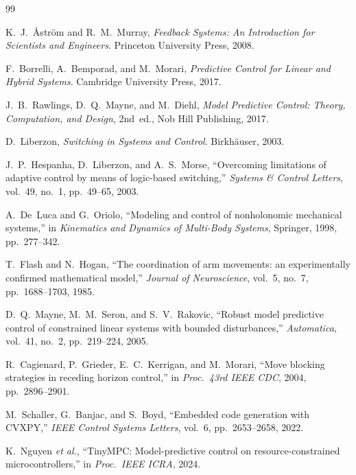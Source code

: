 \documentclass[12pt,a4paper,oneside]{report}
\begin{document}

\begin{thebibliography}{99}

K.~J.~\r{A}str\"{o}m and R.~M.~Murray,
\textit{Feedback Systems: An Introduction for Scientists and Engineers}.
Princeton University Press, 2008.

F.~Borrelli, A.~Bemporad, and M.~Morari,
\textit{Predictive Control for Linear and Hybrid Systems}.
Cambridge University Press, 2017.

J.~B.~Rawlings, D.~Q.~Mayne, and M.~Diehl,
\textit{Model Predictive Control: Theory, Computation, and Design}, 2nd~ed.,
Nob Hill Publishing, 2017.

D.~Liberzon,
\textit{Switching in Systems and Control}.
Birkh\"{a}user, 2003.

J.~P.~Hespanha, D.~Liberzon, and A.~S.~Morse,
``Overcoming limitations of adaptive control by means of logic-based switching,''
\textit{Systems \& Control Letters}, vol.~49, no.~1, pp.~49--65, 2003.

A.~De~Luca and G.~Oriolo,
``Modeling and control of nonholonomic mechanical systems,''
in \textit{Kinematics and Dynamics of Multi-Body Systems},
Springer, 1998, pp.~277--342.

T.~Flash and N.~Hogan,
``The coordination of arm movements: an experimentally confirmed mathematical model,''
\textit{Journal of Neuroscience}, vol.~5, no.~7, pp.~1688--1703, 1985.

D.~Q.~Mayne, M.~M.~Seron, and S.~V.~Rakovic,
``Robust model predictive control of constrained linear systems with bounded disturbances,''
\textit{Automatica}, vol.~41, no.~2, pp.~219--224, 2005.

R.~Cagienard, P.~Grieder, E.~C.~Kerrigan, and M.~Morari,
``Move blocking strategies in receding horizon control,''
in \textit{Proc.\ 43rd IEEE CDC}, 2004, pp.~2896--2901.

M.~Schaller, G.~Banjac, and S.~Boyd,
``Embedded code generation with CVXPY,''
\textit{IEEE Control Systems Letters}, vol.~6, pp.~2653--2658, 2022.

K.~Nguyen \textit{et al.},
``TinyMPC: Model-predictive control on resource-constrained microcontrollers,''
in \textit{Proc.\ IEEE ICRA}, 2024.


\end{thebibliography}
\end{document}
